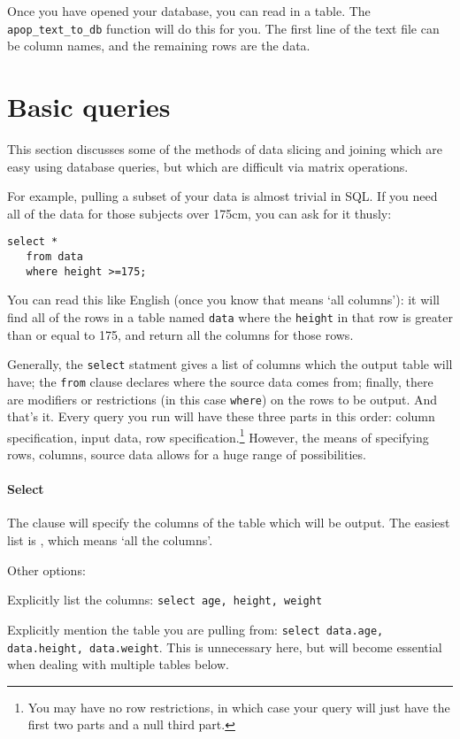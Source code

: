 Once you have opened your database, you can read in a table. The {\tt
apop\_text\_to\_db} function will do this for you. The first line of the
text file can be column names, and the remaining rows are the data. 


\section{Basic queries}
This section discusses some of the methods of data slicing and joining
which are easy using database queries, but which are difficult via
matrix operations.

For example, pulling a subset of your data is almost trivial in SQL. If
you need all of the data for those subjects over 175cm, you can ask for
it thusly:

\begin{verbatim}
select * 
   from data 
   where height >=175;
\end{verbatim}

You can read this like English (once you know that {\tt *} means `all
columns'): it will find all of the rows in a table named {\tt data}
where the {\tt height} in that row is greater than or equal to 175, and
return all the columns for those rows.


Generally, the {\tt select} statment gives a list of columns which the output
table will have; the {\tt from} clause declares where the source data
comes from; finally, there are modifiers or restrictions (in this case
{\tt where}) on the rows to be output.  And that's it. Every query
you run will have these three parts in this order: column specification, input data,
row specification.\footnote{You may have
no row restrictions, in which case your query will just have the first
two parts and a null third part.} However, the means of specifying rows, columns,
source data allows for a huge range of possibilities.

\paragraph{Select}
The  clause will specify the columns of the table which will
be output. The easiest list is {\tt *}, which means `all the columns'.

Other options:

Explicitly list the columns: {\tt select age, height, weight}

Explicitly mention the table you are pulling from: {\tt select data.age,
data.height, data.weight}. This is unnecessary here, but will become
essential when dealing with multiple tables below.

